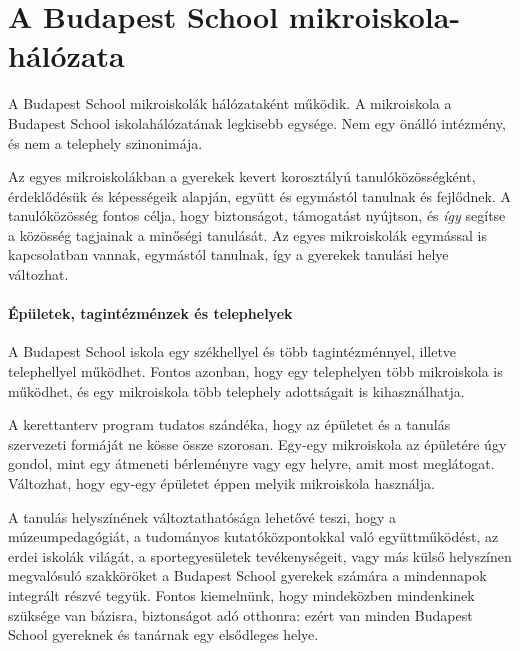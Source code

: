 \section{A Budapest School mikroiskola-hálózata}


A Budapest School mikroiskolák hálózataként működik. A mikroiskola a Budapest
School iskolahálózatának legkisebb egysége. Nem egy önálló intézmény, és nem a
telephely szinonimája.

Az egyes mikroiskolákban a gyerekek kevert korosztályú tanulóközösségként,
érdeklődésük és képességeik alapján, együtt és egymástól tanulnak és fejlődnek.
A tanulóközösség fontos célja, hogy biztonságot, támogatást nyújtson, és
\emph{így} segítse a közösség tagjainak a minőségi tanulását. Az egyes
mikroiskolák egymással is kapcsolatban vannak,
egymástól tanulnak, így a gyerekek tanulási helye változhat.

\paragraph{Épületek, tagintézménzek és telephelyek}
A Budapest School iskola egy székhellyel és több tagintézménnyel, illetve
telephellyel működhet. Fontos azonban, hogy egy telephelyen több mikroiskola is
működhet, és egy mikroiskola több telephely adottságait is kihasználhatja.

A 
\ifkerettanterv
kerettanterv
\else
program
\fi tudatos szándéka, hogy az épületet és a
tanulás szervezeti formáját ne kösse össze szorosan. Egy-egy mikroiskola az
épületére úgy gondol, mint egy átmeneti bérleményre vagy egy helyre, amit most
meglátogat.
Változhat, hogy egy-egy épületet éppen melyik mikroiskola használja.

A tanulás helyszínének változtathatósága lehetővé teszi, hogy a
múzeumpedagógiát, a tudományos kutatóközpontokkal való együttműködést, az erdei
iskolák világát, a sportegyesületek tevékenységeit, vagy más külső helyszínen
megvalósuló szakköröket a Budapest School gyerekek számára a mindennapok
integrált részvé tegyük. Fontos kiemelnünk, hogy mindeközben mindenkinek
szüksége van bázisra, biztonságot adó otthonra: ezért van minden Budapest
School gyereknek és tanárnak egy elsődleges helye.
\ifkerettanterv
